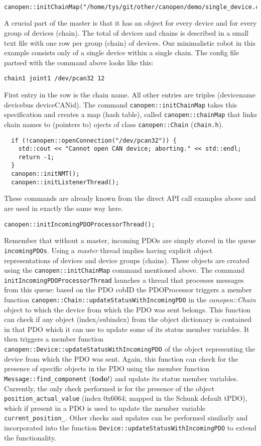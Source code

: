\begin{verbatim}
 canopen::initChainMap("/home/tys/git/other/canopen/demo/single_device.csv");
\end{verbatim}
A crucial part of the master is that it has an object for every device and for every group of devices (chain). The total of devices and chains is described in a small text file with one row per group (chain) of devices. Our minimalistic robot in this example consists only of a single device within a single chain. The config file partsed with the command above looks like this:

\begin{verbatim}
chain1 joint1 /dev/pcan32 12
\end{verbatim}
First entry in the row is the chain name. All other entries are triples (devicename devicebus deviceCANid). The command \texttt{canopen::initChainMap} takes this specification and creates a map (hash table), called \texttt{canopen::chainMap} that links chain names to (pointers to) ojects of class \texttt{canopen::Chain} (\texttt{chain.h}).

\begin{verbatim}
  if (!canopen::openConnection("/dev/pcan32")) {
    std::cout << "Cannot open CAN device; aborting." << std::endl;
    return -1;
  } 
  canopen::initNMT();
  canopen::initListenerThread();
\end{verbatim}
These commands are already known from the direct API call examples above and are used in exactly the same way here.

\begin{verbatim}
canopen::initIncomingPDOProcessorThread();
\end{verbatim}
Remember that without a master, incoming PDOs are simply stored in the queue \texttt{incomingPDOs}. Using a {\em master} thread implies having explicit object representations of devices and device groups (chains). These objects are created using the \texttt{canopen::initChainMap} command mentioned above. The command \texttt{initIncomingPDOProcessorThread} launches a thread that processes messages from this queue: based on the PDO cobID the PDOProcessor triggers a member function \texttt{canopen::Chain::updateStatusWithIncomingPDO} in the {\em canopen::Chain} object to which the device from which the PDO was sent belongs. This function can check if any object (index/subindex) from the object dictionary is contained in that PDO which it can use to update some of its status member variables. It then triggers a member function \texttt{canopen::Device::updateStatusWithIncomingPDO} of the object representing the device from which the PDO was sent. Again, this function can check for the presence of specific objects in the PDO using the member function \texttt{Message::find\_component} ({\bf todo}!) and update its status member variables. Currently, the only check performed is for the presence of the object \texttt{position\_actual\_value} (index 0x6064; mapped in the Schunk default tPDO), which if present in a PDO is used to update the member variable \texttt{current\_position\_}. Other checks and updates can be performed similarly and incorporated into the function \texttt{Device::updateStatusWithIncomingPDO} to extend the functionality.

